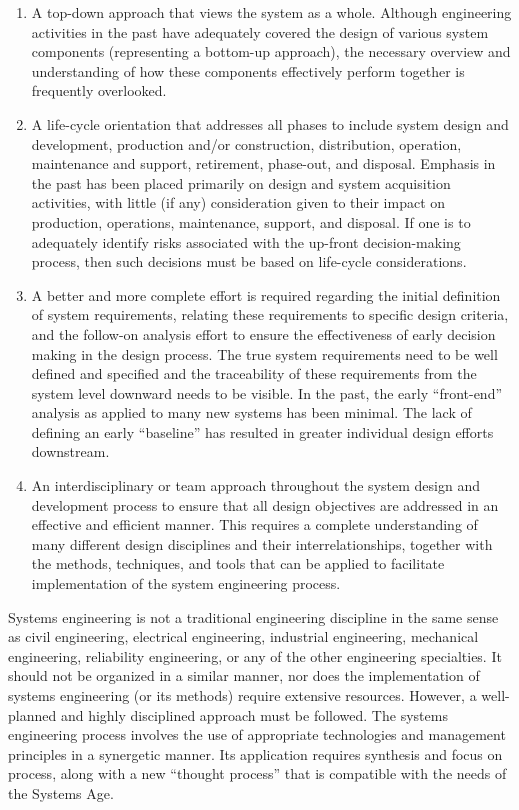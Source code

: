 \begin{enumerate}
\item A top-down approach that views the system as a whole. Although engineering activities in the past have adequately covered the design of various system components (representing a bottom-up approach), the necessary overview and understanding of how these components effectively perform together is frequently overlooked.
\item A life-cycle orientation that addresses all phases to include system design and development, production and/or construction, distribution, operation, maintenance and support, retirement, phase-out, and disposal. Emphasis in the past has been placed primarily on design and system acquisition activities, with little (if any) consideration given to their impact on production, operations, maintenance, support, and disposal. If one is to adequately identify risks associated with the up-front decision-making process, then such decisions must be based on life-cycle considerations.
\item A better and more complete effort is required regarding the initial definition of system requirements, relating these requirements to specific design criteria, and the follow-on analysis effort to ensure the effectiveness of early decision making in the design process. The true system requirements need to be well defined and specified and the traceability of these requirements from the system level downward needs to be visible. In the past, the early “front-end” analysis as applied to many new systems has been minimal. The lack of defining an early “baseline” has resulted in greater individual design efforts downstream.
\item An interdisciplinary or team approach throughout the system design and development process to ensure that all design objectives are addressed in an effective and efficient manner. This requires a complete understanding of many different design disciplines and their interrelationships, together with the methods, techniques, and tools that can be applied to facilitate implementation of the system engineering process.
\end{enumerate}

Systems engineering is not a traditional engineering discipline in the same sense as civil engineering, electrical engineering, industrial engineering, mechanical engineering, reliability engineering, or any of the other engineering specialties. It should not be organized in a similar manner, nor does the implementation of systems engineering (or its methods) require extensive resources. However, a well-planned and highly disciplined approach must be followed. The systems engineering process involves the use of appropriate technologies and management principles in a synergetic manner. Its application requires synthesis and focus on process, along with a new “thought process” that is compatible with the needs of the Systems Age.

